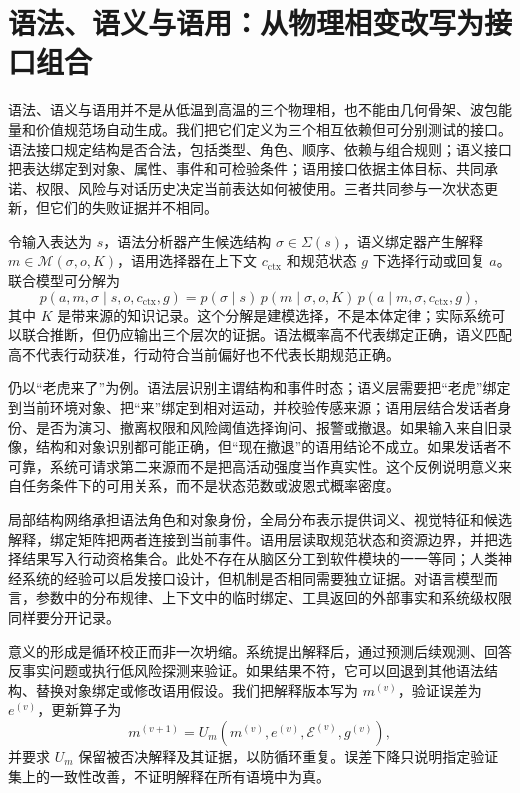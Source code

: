\section{语法、语义与语用：从物理相变改写为接口组合}
\label{sec:meaning_phase_transition}

语法、语义与语用并不是从低温到高温的三个物理相，也不能由几何骨架、波包能量和价值规范场自动生成。我们把它们定义为三个相互依赖但可分别测试的接口。语法接口规定结构是否合法，包括类型、角色、顺序、依赖与组合规则；语义接口把表达绑定到对象、属性、事件和可检验条件；语用接口依据主体目标、共同承诺、权限、风险与对话历史决定当前表达如何被使用。三者共同参与一次状态更新，但它们的失败证据并不相同。

令输入表达为 $s$，语法分析器产生候选结构 $\sigma\in\Sigma(s)$，语义绑定器产生解释 $m\in\mathcal M(\sigma,o,K)$，语用选择器在上下文 $c_{\mathrm{ctx}}$ 和规范状态 $g$ 下选择行动或回复 $a$。联合模型可分解为
\begin{equation}
 p(a,m,\sigma\mid s,o,c_{\mathrm{ctx}},g)
 =p(\sigma\mid s)\,p(m\mid\sigma,o,K)\,
 p(a\mid m,\sigma,c_{\mathrm{ctx}},g),
\end{equation}
其中 $K$ 是带来源的知识记录。这个分解是建模选择，不是本体定律；实际系统可以联合推断，但仍应输出三个层次的证据。语法概率高不代表绑定正确，语义匹配高不代表行动获准，行动符合当前偏好也不代表长期规范正确。

仍以“老虎来了”为例。语法层识别主谓结构和事件时态；语义层需要把“老虎”绑定到当前环境对象、把“来”绑定到相对运动，并校验传感来源；语用层结合发话者身份、是否为演习、撤离权限和风险阈值选择询问、报警或撤退。如果输入来自旧录像，结构和对象识别都可能正确，但“现在撤退”的语用结论不成立。如果发话者不可靠，系统可请求第二来源而不是把高活动强度当作真实性。这个反例说明意义来自任务条件下的可用关系，而不是状态范数或波恩式概率密度。

局部结构网络承担语法角色和对象身份，全局分布表示提供词义、视觉特征和候选解释，绑定矩阵把两者连接到当前事件。语用层读取规范状态和资源边界，并把选择结果写入行动资格集合。此处不存在从脑区分工到软件模块的一一等同；人类神经系统的经验可以启发接口设计，但机制是否相同需要独立证据。对语言模型而言，参数中的分布规律、上下文中的临时绑定、工具返回的外部事实和系统级权限同样要分开记录。

意义的形成是循环校正而非一次坍缩。系统提出解释后，通过预测后续观测、回答反事实问题或执行低风险探测来验证。如果结果不符，它可以回退到其他语法结构、替换对象绑定或修改语用假设。我们把解释版本写为 $m^{(v)}$，验证误差为 $e^{(v)}$，更新算子为
\begin{equation}
 m^{(v+1)}=U_m(m^{(v)},e^{(v)},\mathcal E^{(v)},g^{(v)}),
\end{equation}
并要求 $U_m$ 保留被否决解释及其证据，以防循环重复。误差下降只说明指定验证集上的一致性改善，不证明解释在所有语境中为真。

